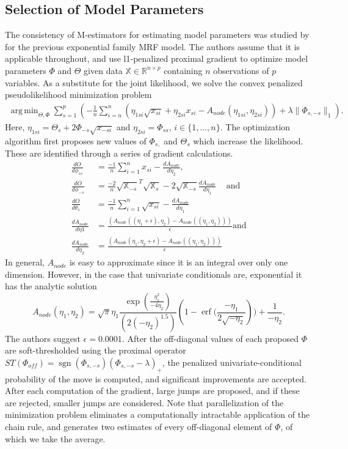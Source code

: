 \documentclass{samkoelleprelimworking}
\DeclareMathOperator{\sgn}{sgn}
\DeclareMathOperator\erf{erf}
\DeclareMathOperator*{\argmin}{arg\,min}
\begin{document}
\subsection{Selection of Model Parameters} \label{Optimization}

The consistency of M-estimators for estimating model parameters was studied by \citet{Yang2013-wa} for the previous exponential family MRF model.  The authors assume that it is applicable throughout, and use l1-penalized proximal gradient to optimize model parameters $\Phi$ and $\Theta$ given data $\mathbb{X} \in \mathbb{R}^{n\times p}$ containing $n$ observations of $p$ variables.  As a substitute for the joint likelihood, we solve the convex penalized pseudolikelihood minimization problem
\begin{align}
 \argmin_{\Theta, \Phi} \sum_{s = 1}^{p} (-\frac{1}{n} \sum_{i = n}^n (\eta_{1si} \sqrt{x_{si}} + \eta_{2si} x_{si} - A_{node} ( \eta_{1si}, \eta_{2si} )) + \lambda\| \Phi_{s,-s} \|_1).
 \end{align}
Here, $\eta_{1si} = \Theta_s + 2 \Phi_{-s}\sqrt{x_{-si}}$ and $\eta_{2si} = \Phi_{ss}$, $i \in \{1,\dotsc, n\}$.  The optimization algorithm first proposes new values of $\Phi_{s,}$ and $\Theta_s$ which increase the likelihood.  These are identified through a series of gradient calculations.  
\begin{align*}
\frac{dO}{d\phi_{ss}} &= \frac{-1}{n} \sum_{i=1}^{n} x_{si} - \frac{dA_{node}}{d\eta_2}, \\
\frac{dO}{d\phi_{-s}} &= \frac{-2}{n} \sqrt{\mathbb{X}_{-s}}^T \sqrt{\mathbb{X}_s} - 2 \sqrt{\mathbb{X}_{-s}} \frac{dA_{node}}{d\eta_1}\, \quad \text{and}  \\
\frac{dO}{d\theta_{s}} &= \frac{-1}{n} \sum_{i=1}^{n} \sqrt{x_{si}} - \frac{dA_{node}}{d\eta_1} \\
\frac{dA_{node}}{d\eta1} &= \frac{(A_{node}((\eta_1 + \epsilon), \eta_2) - A_{node}((\eta_1 , \eta_2)))}{\epsilon} \text{and} \\
\frac{dA_{node}}{d\eta_2} &= \frac{(A_{node}(\eta_1 , \eta_2+ \epsilon) - A_{node}((\eta_1 , \eta_2)))}{\epsilon}
\end{align*}
In general, $A_{node}$ is easy to approximate since it is an integral over only one dimension. However, in the case that univariate conditionals are, exponential it has the analytic solution
\[A_{node} (\eta_1, \eta_2) = \sqrt{\pi}  \eta_1 \frac{\exp{ ( \frac{\eta_1^2}{-4\eta_2} ) }} { (2(-\eta_2)^{1.5})} (1 - \erf{(\frac{-\eta_1}{2 \sqrt{ -\eta_2}}}))  + \frac{1}{-\eta_2}.\]
The authors suggest $\epsilon = 0.0001$.
After the off-diagonal values of each proposed $\Phi$ are soft-thresholded using the proximal operator $ST(\Phi_{off}) = \sgn{ (\Phi_{s,-s} )} (\Phi_{s,-s} - \lambda)_+$, the penalized univariate-conditional probability of the move is computed, and significant improvements are accepted.  After each computation of the gradient, large jumps are proposed, and if these are rejected, smaller jumps are considered.  Note that parallelization of the minimization problem eliminates a computationally intractable application of the chain rule, and generates two estimates of every off-diagonal element of $\Phi$, of which we take the average.
\end{document}
